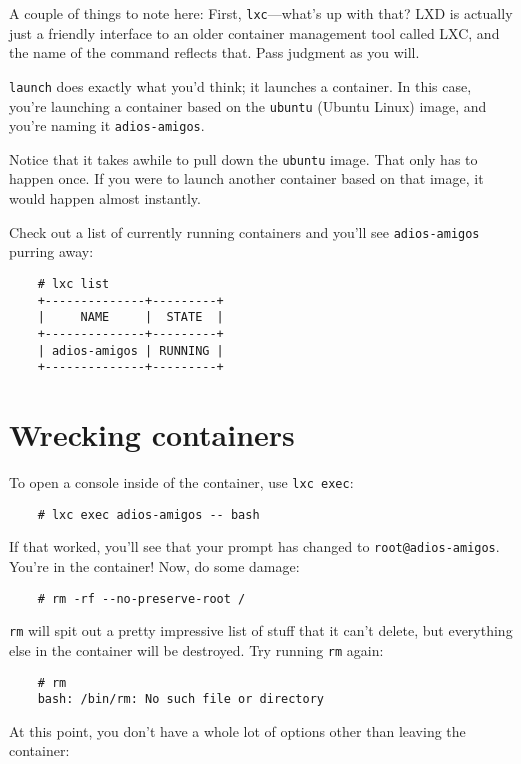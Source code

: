 A couple of things to note here: First, \texttt{lxc}---what's up with that? LXD is actually just a friendly interface to an older container management tool called LXC, and the name of the command reflects that. Pass judgment as you will.

\texttt{launch} does exactly what you'd think; it launches a container. In this case, you're launching a container based on the \texttt{ubuntu} (Ubuntu Linux) image, and you're naming it \texttt{adios-amigos}.

Notice that it takes awhile to pull down the \texttt{ubuntu} image. That only has to happen once. If you were to launch another container based on that image, it would happen almost instantly.

Check out a list of currently running containers and you'll see \texttt{adios-amigos} purring away:

\begin{verbatim}
    # lxc list
    +--------------+---------+
    |     NAME     |  STATE  |
    +--------------+---------+
    | adios-amigos | RUNNING |
    +--------------+---------+
\end{verbatim}

\section*{Wrecking containers}

To open a console inside of the container, use \texttt{lxc exec}:

\begin{verbatim}
    # lxc exec adios-amigos -- bash
\end{verbatim}

If that worked, you'll see that your prompt has changed to \texttt{root@adios-amigos}. You're in the container! Now, do some damage:

\begin{verbatim}
    # rm -rf --no-preserve-root /
\end{verbatim}

\texttt{rm} will spit out a pretty impressive list of stuff that it can't delete, but everything else in the container will be destroyed. Try running \texttt{rm} again:

\begin{verbatim}
    # rm
    bash: /bin/rm: No such file or directory
\end{verbatim}

At this point, you don't have a whole lot of options other than leaving the container:

